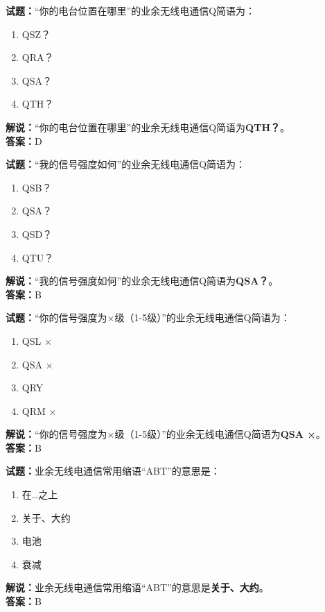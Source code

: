 \documentclass{ctexbook}
\begin{document}
\bigskip


\noindent\textbf{试题：}“你的电台位置在哪里”的业余无线电通信Q简语为：
\begin{enumerate}[leftmargin=3em]
\item QSZ？
\item QRA？
\item QSA？
\item QTH？
\end{enumerate}
\noindent\textbf{解说：}“你的电台位置在哪里”的业余无线电通信Q简语为\textbf{QTH？}。\\\noindent\textbf{答案：}D



\bigskip


\noindent\textbf{试题：}“我的信号强度如何”的业余无线电通信Q简语为：
\begin{enumerate}[leftmargin=3em]
\item QSB？
\item QSA？
\item QSD？
\item QTU？
\end{enumerate}
\noindent\textbf{解说：}“我的信号强度如何”的业余无线电通信Q简语为\textbf{QSA？}。\\\noindent\textbf{答案：}B



\bigskip


\noindent\textbf{试题：}“你的信号强度为×级（1-5级）”的业余无线电通信Q简语为：
\begin{enumerate}[leftmargin=3em]
\item QSL ×
\item QSA ×
\item QRY
\item QRM ×
\end{enumerate}
\noindent\textbf{解说：}“你的信号强度为×级（1-5级）”的业余无线电通信Q简语为\textbf{QSA ×}。\\\noindent\textbf{答案：}B



\bigskip


\noindent\textbf{试题：}业余无线电通信常用缩语“ABT”的意思是：
\begin{enumerate}[leftmargin=3em]
\item 在…之上
\item 关于、大约
\item 电池
\item 衰减
\end{enumerate}
\noindent\textbf{解说：}业余无线电通信常用缩语“ABT”的意思是\textbf{关于、大约}。\\\noindent\textbf{答案：}B
\end{document}
